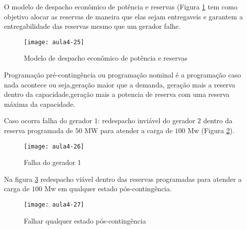 {O modelo de despacho econômico de potência e reservas (Figura \ref{fig:aula4-25} tem como objetivo alocar as reservas de maneira que elas sejam entregaveis e garantem a entregabilidade das reservas mesmo que um gerador falhe. 

\begin{figure}[H]
\begin{centering}
\texttt{[image: aula4-25]}\protect\caption{\label{fig:aula4-25} Modelo de despacho econômico de potência e reservas }
\end{centering}
\end{figure}

Programação pré-contingência ou programação nominal é a programação caso nada acontece ou seja,geração maior que a demanda, geração mais a reserva dentro da capacidade,geração mais a potencia de reserva com uma reserva máxima
da capacidade.

Caso ocorra falha do gerador $1$: redespacho inviável do gerador $2$ dentro da reserva programada de $50$ MW para atender a carga de $100$ Mw (Figura \ref{fig:aula4-26}).
\begin{figure}[H]
\begin{centering}
\texttt{[image: aula4-26]}\protect\caption{\label{fig:aula4-26} Falha do gerador 1}
\end{centering}
\end{figure}
Na figura \ref{fig:aula4-27} redespacho viável dentro das reservas programadas para atender a carga de $100$ Mw em qualquer estado pós-contingência. 

\begin{figure}[H]
\begin{centering}
\texttt{[image: aula4-27]}\protect\caption{\label{fig:aula4-27} Falhar qualquer estado pós-contingência }
\end{centering}
\end{figure}

}

